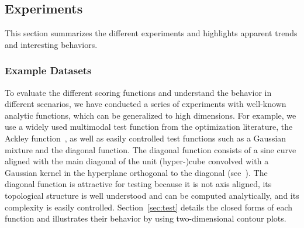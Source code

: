 \subsection{Experiments}
\label{sec:exp}

This section summarizes the different experiments and highlights apparent trends and interesting behaviors.

\subsubsection{Example Datasets} To evaluate the different scoring functions and understand the behavior in different scenarios, we have conducted a series of experiments with well-known analytic functions, which can be generalized to high dimensions.
%
For example, we use a widely used multimodal test function from the optimization literature, the Ackley function~\cite{Ackley1987}, as well as easily controlled test functions such as a Gaussian mixture and the diagonal function.
%
The diagonal function consists of a sine curve aligned with the main diagonal of the unit (hyper-)cube convolved with a Gaussian kernel in the hyperplane orthogonal to the diagonal (see~\cite{GerberBremerPascucci2010}).
%
The diagonal function is attractive for testing because it is not axis aligned, its topological structure is well understood and can be computed analytically, and its complexity is easily controlled.
%
Section~\ref{sec:test} details the closed forms of each function and illustrates their behavior by using two-dimensional contour plots.

